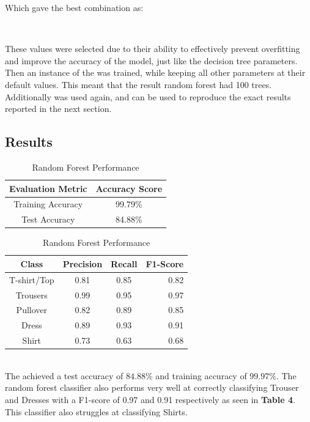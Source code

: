 Which gave the best combination as:\\

\begin{tcolorbox}[colback=white,
                  arc=0pt,
                outer=0pt]
\centering {} \, \,  \, \,  \, \, \\
   \end{tcolorbox}


These values were selected due to their ability to effectively prevent overfitting and improve the accuracy of the model, just like the decision tree parameters.
Then an instance of the  was trained, while keeping all other parameters at their default values.
This meant that the result random forest had 100 trees.
Additionally  was used again, and can be used to reproduce the exact results reported in the next section.

\subsection{Results}\label{subsec:results}
\begin{table}[!ht]
\begin{subtable}[c]{0.4\textwidth}
\footnotesize
\centering
\begin{tabular}{ c | c }
 \toprule
 Evaluation Metric & Accuracy Score  \\
 \midrule
 Training Accuracy &  99.79\% \\
 Test Accuracy & 84.88\% \\
 \bottomrule
\end{tabular}
\captionsetup{justification=centering,margin=1cm}
\end{subtable}
\begin{subtable}[c]{0.6\textwidth}
\footnotesize
\centering
\begin{tabular}{c | c c r}
Class & Precision & Recall & F1-Score\\
\midrule
T-shirt/Top   &    0.81  &    0.85  &    0.82 \\
Trousers   &    0.99  &    0.95  &    0.97 \\
Pullover   &    0.82  &    0.89  &    0.85\\
Dress   &    0.89  &    0.93  &    0.91\\
Shirt   &    0.73  &    0.63  &    0.68\\
\end{tabular}
\captionsetup{justification=centering,margin=1cm}
\end{subtable}
\caption{Random Forest Performance}
\label{tab:random_forest_evaluation}
\end{table}\\

The  achieved a test accuracy of $84.88\%$ and training accuracy of $99.97\%$.
The random forest classifier also performs very well at correctly classifying Trouser and Dresses with a F1-score of 0.97 and 0.91 respectively as seen in \textbf{Table 4}.
This classifier also struggles at classifying Shirts.
